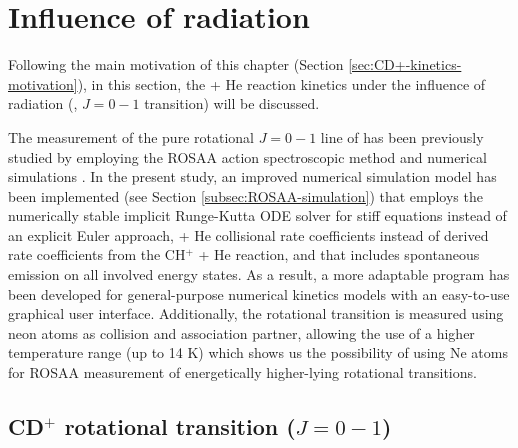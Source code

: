 \section{Influence of radiation}
\label{subsec:rate-constants-laserOn}

Following the main motivation of this chapter (Section
\ref{sec:CD+-kinetics-motivation}), in this section, the \CD + He reaction
kinetics under the influence of radiation (\CD, $J=0-1$ transition) will be
discussed.

The measurement of the pure rotational $J=0-1$ line of \CD has been previously
studied by employing the ROSAA action spectroscopic method and numerical
simulations \cite{kluge_state-selective_2016, Brunken2017}. In the present study, an
improved numerical simulation model has been implemented (see Section
\ref{subsec:ROSAA-simulation}) that employs the numerically stable implicit
Runge-Kutta ODE solver for stiff equations instead of an explicit Euler approach,
\CD + He collisional rate coefficients \cite{Werfelli2017} instead of derived
rate coefficients from the CH$^+$ + He reaction, and that includes spontaneous
emission on all involved energy states. As a result, a more adaptable program
has been developed for general-purpose numerical kinetics models with an
easy-to-use graphical user interface. Additionally, the \CD \CDline rotational
transition is measured using neon atoms as collision and association partner,
allowing the use of a higher temperature range (up to 14 K) which shows us the
possibility of using Ne atoms for ROSAA measurement of energetically
higher-lying rotational transitions.

\subsection{CD\texorpdfstring{$^+$}{+} rotational transition (\texorpdfstring{$J=0-1$}{J=0-1})}
\label{subsec:CD+-spectroscopy}

% 

